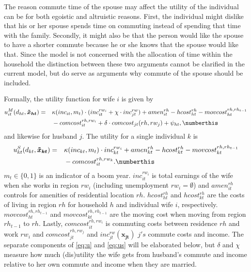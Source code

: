 The reason commute time of the spouse may affect the utility of the individual can be for both egoistic and altruistic reasons. First, the individual might dislike that his or her spouse spends time on commuting instead of spending that time with the family. Secondly, it might also be that the person would like the spouse to have a shorter commute because he or she knows that the spouse would like that. Since the model is not concerned with the allocation of time within the household the distinction between these two arguments cannot be clarified in the current model, but do serve as arguments why commute of the spouse should be included.

Formally, the utility function for wife $i$ is given by
\begin{alignat*}{3}
&u_{it}^M(d_{ht},\boldsymbol{\tilde{x}_{ht}})=&&\kappa(inc_{it},m_t)\cdot (inc_{it}^{rw_i}+\chi\cdot inc_{jt}^{rw})+amen_{it}^{rh}-hcost_{ht}^{rh}-movcost_{ht}^{rh,rh_{t-1}}\\
& && -comcost_{it}^{rh,rw_i}+\delta \cdot comcost_{jt}(rh,rw_j)+ \psi_{ht},\numberthis \label{eq:u}
\end{alignat*}
and likewise for husband $j$. The utility for a single individual $k$ is
\begin{alignat*}{3}
&u_{kt}^S(d_{kt},\boldsymbol{\tilde{x}_{kt}})=&&\kappa(inc_{kt},m_t)\cdot inc_{kt}^{rw_i}+amen_{kt}^{rh}-hcost_{kt}^{rh}-movcost_{kt}^{rh,rh_{t-1}} \\
& &&-comcost_{it}^{rh,rw_{k}}.\numberthis \label{eq:us}
\end{alignat*}
$m_t\in\{0,1\}$ is an indicator of a boom year. $inc_{it}^{rw_i}$ is total earnings of the wife when she works in region $rw_i$ (including unemployment $rw_i=\emptyset$) and $amen_{it}^{rh}$ controls for amenities of residential location $rh$. $hcost_{ht}^{rh}$ and $hcost_{kt}^{rh}$ are the costs of living in region $rh$ for household $h$ and individual wife $i$, respectively. $movcost_{ht}^{rh,rh_{t-1}}$ and  $movcost_{kt}^{rh,rh_{t-1}}$ are the moving cost when moving from region $rh_{t-1}$ to $rh$. Lastly, $comcost_{it}^{rh,rw_i}$ is commuting costs between residence $rh$ and work $rw_i$ and $comcost_{jt}^{rh,rw_j}$ and $inc_{jt}^{rw}(\boldsymbol{x_{jt}})$ $j's$ commute costs and income. The separate components of \eqref{eq:u} and \eqref{eq:us} will be elaborated below, but $\delta$ and $\chi$ measure how much (dis)utility the wife gets from husband's commute and income relative to her own commute and income when they are married. 

